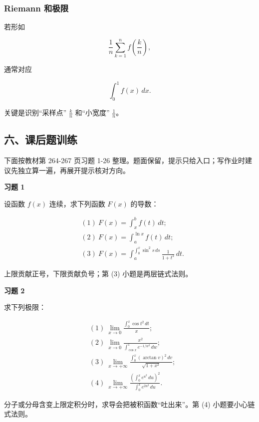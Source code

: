 \subsubsection*{Riemann 和极限}

若形如

\[
      \frac1n\sum_{k=1}^n f\!\left(\frac{k}{n}\right),
    \]

通常对应

\[
      \int_0^1 f(x)\,dx.
    \]

关键是识别“采样点” \(\frac{k}{n}\) 和“小宽度” \(\frac1n\)。

\subsection*{六、课后题训练}

下面按教材第 264-267 页习题 1-26 整理。题面保留，提示只给入口；写作业时建议先独立算一遍，再展开提示核对方向。

\begin{exercisebox}
\textbf{习题 1 }

设函数 \(f(x)\) 连续，求下列函数 \(F(x)\) 的导数：

\[
      \begin{aligned}
      &(1)\ F(x)=\int_x^b f(t)\,dt;\\
      &(2)\ F(x)=\int_a^{\ln x} f(t)\,dt;\\
      &(3)\ F(x)=\int_a^{\int_0^x\sin^2s\,ds}\frac{1}{1+t^2}\,dt.
      \end{aligned}
      \]

\begin{hintbox}
上限贡献正号，下限贡献负号；第 (3) 小题是两层链式法则。
\end{hintbox}
\end{exercisebox}

\begin{exercisebox}
\textbf{习题 2 }

求下列极限：

\[
      \begin{aligned}
      &(1)\ \lim_{x\to0}\frac{\int_0^x\cos t^2\,dt}{x};\\
      &(2)\ \lim_{x\to0}\frac{x^2}{\int_{\cos x}^{1}e^{-1/w^2}\,dw};\\
      &(3)\ \lim_{x\to+\infty}\frac{\int_0^x(\arctan v)^2\,dv}{\sqrt{1+x^2}};\\
      &(4)\ \lim_{x\to+\infty}\frac{\left(\int_0^x e^{u^2}\,du\right)^2}{\int_0^x e^{2u^2}\,du}.
      \end{aligned}
      \]

\begin{hintbox}
分子或分母含变上限定积分时，求导会把被积函数“吐出来”。第 (4) 小题要小心链式法则。
\end{hintbox}
\end{exercisebox}


